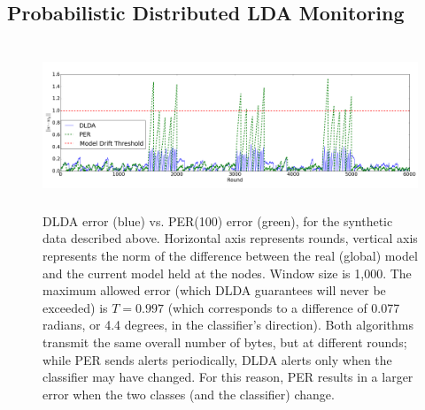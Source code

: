 \subsection{Probabilistic Distributed LDA Monitoring}\label{sec:PDLDA}
%

\begin{figure}
	\centering
	\includegraphics[width=\textwidth, height=5cm]{graphics/PERvsDLDAoverTime.png}
	\caption{DLDA error (blue) vs. PER(100) error (green), for the synthetic
	data described above. Horizontal axis represents rounds, vertical
	axis represents the norm of the difference between the real (global) model and the current model held at the nodes. Window size is 1,000.
	The maximum allowed error (which DLDA guarantees will never be
	exceeded) is $T = 0.997$ (which corresponds to a difference of
	0.077 radians, or 4.4 degrees, in the classifier's direction). Both
	algorithms transmit the same overall number of bytes, but at different
	rounds; while PER sends alerts periodically, DLDA alerts only when the classifier may have changed. For this reason, PER results in a larger
	error when the two classes (and the classifier) change. \label{PERvsDLDAoverTime}
}
\end{figure}


